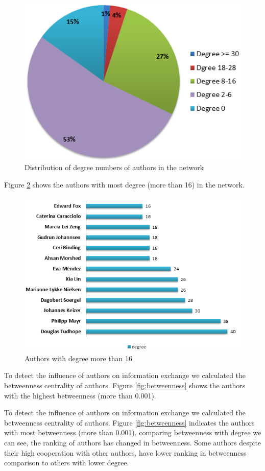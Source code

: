 \documentclass[runningheads,a4paper]{llncs}
\begin{document}
\begin{figure}[H]
	\centering
	\includegraphics[width=0.6\linewidth]{degreePercentage}
	\caption{Distribution of degree numbers of authors in the network} 
	\label{fig:degreePercentage}
\end{figure}

Figure \ref{fig:degree16} shows the authors with most degree (more than 16) in the network. 

\begin{figure}[H]
	\centering
	\includegraphics[width=0.8\linewidth]{degree16}
	\caption{Authors with degree more than 16}
	\label{fig:degree16}
\end{figure}


To detect the influence of authors on information exchange we calculated the betweenness centrality of authors. Figure \ref{fig:betweenness} shows the authors with the highest betweenness (more than 0.001).

To detect the influence of authors on information exchange we calculated the betweenness centrality of authors. Figure \ref{fig:betweenness} indicates the authors with most betweenness (more than 0.001). comparing betweenness with degree we can see, the ranking of authors has changed in betweenness. Some authors despite their high cooperation with other authors, have lower ranking in betweenness comparison to others with lower degree. 
\end{document}
